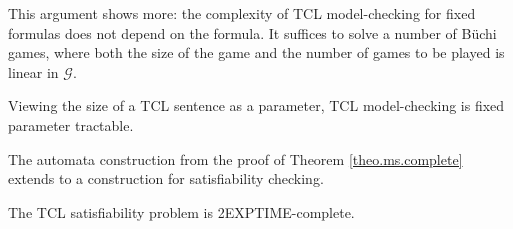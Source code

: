 \documentclass{llncs}
\begin{document}
This argument shows more: the complexity of TCL model-checking for fixed formulas does not depend on the formula.
It suffices to solve a number of B\"uchi games, where both the size of the game and the number of games to be played is linear in $\mathcal G$.

\begin{corollary}
Viewing the size of a TCL sentence as a parameter, TCL model-checking is fixed parameter tractable.
\end{corollary}

The automata construction from the proof of Theorem \ref{theo.ms.complete} extends to a construction for satisfiability checking.

\begin{theorem}
\label{theo.sat.complete}
The TCL satisfiability problem is 2EXPTIME-complete.
\end{theorem}
\end{document}
